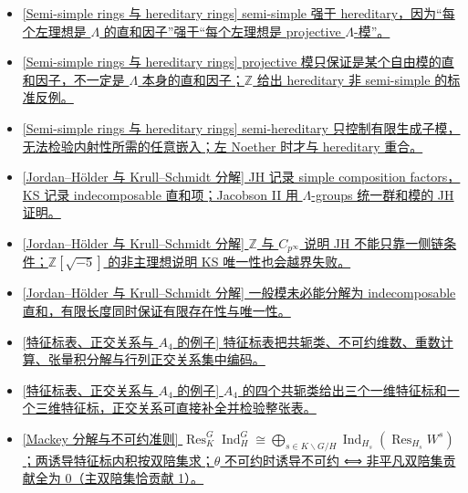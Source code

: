 \documentclass[a4paper]{ctexart}
\theoremstyle{definition}
\theoremstyle{analysis}
\theoremstyle{plain}
\begin{document}
\begin{itemize}
  \item \hyperref[rem:semisimple-hereditary]{[\hyperref[subsec:semisimple-hereditary]{Semi-simple rings 与 hereditary rings}] semi-simple 强于 hereditary，因为“每个左理想是 \(\Lambda\) 的直和因子”强于“每个左理想是 projective \(\Lambda\)-模”。}
  \item \hyperref[rem:projective-vs-summand]{[\hyperref[subsec:semisimple-hereditary]{Semi-simple rings 与 hereditary rings}] projective 模只保证是某个自由模的直和因子，不一定是 \(\Lambda\) 本身的直和因子；\(\mathbb Z\) 给出 hereditary 非 semi-simple 的标准反例。}
  \item \hyperref[rem:semihereditary-injective-quotient]{[\hyperref[subsec:semisimple-hereditary]{Semi-simple rings 与 hereditary rings}] semi-hereditary 只控制有限生成子模，无法检验内射性所需的任意嵌入；左 Noether 时才与 hereditary 重合。}
  \item \hyperref[rem:jh-vs-ks]{[\hyperref[subsec:jh-ks-decomposition]{Jordan--Hölder 与 Krull--Schmidt 分解}] JH 记录 simple composition factors，KS 记录 indecomposable 直和项；Jacobson II 用 \(\Lambda\)-groups 统一群和模的 JH 证明。}
  \item \hyperref[rem:ks-chain-condition-boundary]{[\hyperref[subsec:jh-ks-decomposition]{Jordan--Hölder 与 Krull--Schmidt 分解}] \(\mathbb Z\) 与 \(C_{p^\infty}\) 说明 JH 不能只靠一侧链条件；\(\mathbb Z[\sqrt{-5}]\) 的非主理想说明 KS 唯一性也会越界失败。}
  \item \hyperref[rem:indecomposable-decomposition-not-automatic]{[\hyperref[subsec:jh-ks-decomposition]{Jordan--Hölder 与 Krull--Schmidt 分解}] 一般模未必能分解为 indecomposable 直和，有限长度同时保证有限存在性与唯一性。}
  \item \hyperref[rem:character-table-information]{[\hyperref[subsec:character-table-a4]{特征标表、正交关系与 \(A_4\) 的例子}] 特征标表把共轭类、不可约维数、重数计算、张量积分解与行列正交关系集中编码。}
  \item \hyperref[rem:a4-character-table]{[\hyperref[subsec:character-table-a4]{特征标表、正交关系与 \(A_4\) 的例子}] \(A_4\) 的四个共轭类给出三个一维特征标和一个三维特征标，正交关系可直接补全并检验整张表。}
  \item \hyperref[subsec:mackey-decomposition]{[Mackey 分解与不可约准则] \(\operatorname{Res}_K^G\operatorname{Ind}_H^G\cong\bigoplus_{s\in K\backslash G/H}\operatorname{Ind}_{H_s}(\operatorname{Res}_{H_s}W^s)\)；两诱导特征标内积按双陪集求；\(\theta\) 不可约时诱导不可约 ⟺ 非平凡双陪集贡献全为 0（主双陪集恰贡献 1）。}
\end{itemize}
\end{document}
